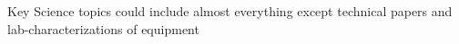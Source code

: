 Key Science topics could include almost everything except technical papers and lab-characterizations of equipment








